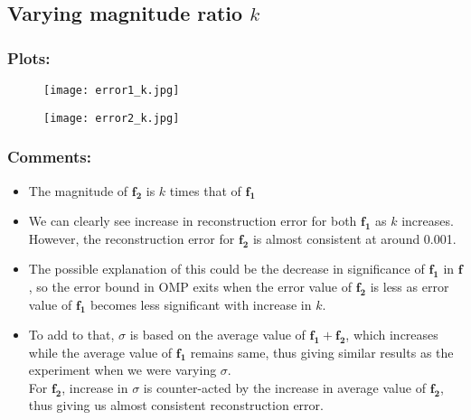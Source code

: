 \documentclass[fleqn, 11pt]{article}
\begin{document}
\subsection*{Varying magnitude ratio $k$}
\subsubsection*{Plots:}
\begin{figure}[H]
    \centering
    \begin{floatrow}
      {\texttt{[image: error1\_k.jpg]}}
      
      {\texttt{[image: error2\_k.jpg]}}
    \end{floatrow}
\end{figure}

\subsubsection*{Comments:}
\begin{itemize}
    \item The magnitude of $\boldsymbol{f_2}$ is $k$ times that of $\boldsymbol{f_1}$
    \item We can clearly see increase in reconstruction error for both $\boldsymbol{f_1}$ as $k$ increases. \\
    However, the reconstruction error for $\boldsymbol{f_2}$ is almost consistent at around 0.001.
    \item The possible explanation of this could be the decrease in significance of $\boldsymbol{f_1}$ in $\boldsymbol{f}$, so the error bound in OMP exits when the error value of $\boldsymbol{f_2}$ is less as error value of $\boldsymbol{f_1}$ becomes less significant with increase in $k$.
    \item To add to that, $\sigma$ is based on the average value of $\boldsymbol{f_1} + \boldsymbol{f_2}$, which increases while the average value of $\boldsymbol{f_1}$ remains same, thus giving similar results as the experiment when we were varying $\sigma$. \\
    For $\boldsymbol{f_2}$, increase in $\sigma$ is counter-acted by the increase in average value of $\boldsymbol{f_2}$, thus giving us almost consistent reconstruction error.
\end{itemize}


\newpage
\end{document}
